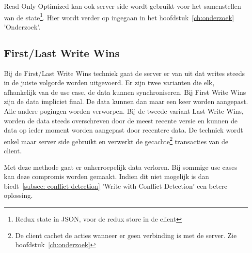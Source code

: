 Read-Only Optimized kan ook server side wordt gebruikt voor het samenstellen van de state\footnote{Redux state in JSON, voor de redux store in de client}. Hier wordt verder op ingegaan in het hoofdstuk~\ref{ch:onderzoek} 'Onderzoek'.

\subsection{First/Last Write Wins}
Bij de First/Last Write Wins techniek gaat de server er van uit dat writes steeds in de juiste volgorde worden uitgevoerd. Er zijn twee varianten die elk, afhankelijk van de use case, de data kunnen synchroniseren. Bij First Write Wins zijn de data impliciet final. De data kunnen dan maar een keer worden aangepast. Alle andere pogingen worden verworpen. Bij de tweede variant Last Write Wins, worden de data steeds overschreven door de meest recente versie en kunnen de data op ieder moment worden aangepast door recentere data. De techniek wordt enkel maar server side gebruikt en verwerkt de gecachte\footnote{De client cachet de acties wanneer er geen verbinding is met de server. Zie hoofdstuk~\ref{ch:onderzoek}} transacties van de client.

Met deze methode gaat er onherroepelijk data verloren. Bij sommige use cases kan deze compromis worden gemaakt. Indien dit niet mogelijk is dan biedt~\ref{subsec: conflict-detection} 'Write with Conflict Detection' een betere oplossing.

